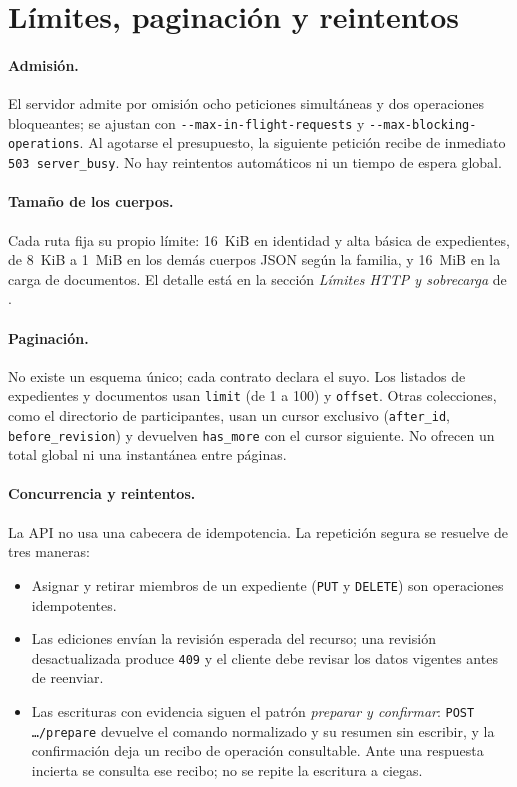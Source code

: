 \section{Límites, paginación y reintentos}\label{sec:api-limites}

\paragraph{Admisión.} El servidor admite por omisión ocho peticiones
simultáneas y dos operaciones bloqueantes; se ajustan con
\texttt{-{}-max-in-flight-requests} y \texttt{-{}-max-blocking-operations}.
Al agotarse el presupuesto, la siguiente petición recibe de inmediato
\texttt{503 server\_busy}. No hay reintentos automáticos ni un tiempo de
espera global.

\paragraph{Tamaño de los cuerpos.} Cada ruta fija su propio límite: 16~KiB en
identidad y alta básica de expedientes, de 8~KiB a 1~MiB en los demás cuerpos
JSON según la familia, y 16~MiB en la carga de documentos. El detalle está en
la sección \emph{Límites HTTP y sobrecarga} de .

\paragraph{Paginación.} No existe un esquema único; cada contrato declara el
suyo. Los listados de expedientes y documentos usan \texttt{limit} (de 1 a
100) y \texttt{offset}. Otras colecciones, como el directorio de
participantes, usan un cursor exclusivo (\texttt{after\_id},
\texttt{before\_revision}) y devuelven \texttt{has\_more} con el cursor
siguiente. No ofrecen un total global ni una instantánea entre páginas.

\paragraph{Concurrencia y reintentos.} La API no usa una cabecera de
idempotencia. La repetición segura se resuelve de tres maneras:

\begin{itemize}
  \item Asignar y retirar miembros de un expediente (\texttt{PUT} y
        \texttt{DELETE}) son operaciones idempotentes.
  \item Las ediciones envían la revisión esperada del recurso; una revisión
        desactualizada produce \texttt{409} y el cliente debe revisar los
        datos vigentes antes de reenviar.
  \item Las escrituras con evidencia siguen el patrón \emph{preparar y
        confirmar}: \texttt{POST \ldots/prepare} devuelve el comando
        normalizado y su resumen sin escribir, y la confirmación deja un
        recibo de operación consultable. Ante una respuesta incierta se
        consulta ese recibo; no se repite la escritura a ciegas.
\end{itemize}


